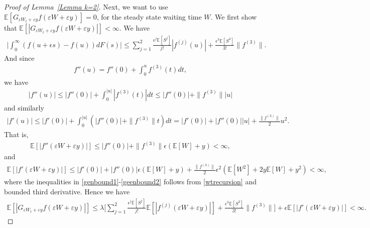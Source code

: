 \documentclass[10pt,a4paper]{amsart}
\begin{document}
\begin{proof}[Proof of Lemma~\ref{Lemma k=2}]
Next, we want to use $ \mathbb E[G_{\varepsilon W_t+\varepsilon y}f(\varepsilon W+\varepsilon y) ]=0$, for the steady state waiting time $W$. We first show that $ \mathbb E[|G_{\varepsilon W_t+\varepsilon y}f(\varepsilon W+\varepsilon y)| ] < \infty$. We have 
\begin{align*}
    \bigg|\int_0^\infty (f(u+\epsilon s)-f(u)) dF(s) \bigg| \leq \sum_{j=1}^2 \frac{\epsilon^j \mathbb E[S^j]}{j!}|f^{(j)}(u)|+\frac{\epsilon^3\mathbb E[S^3]}{3!}\|f^{(3)}\|.
\end{align*}
And since
\begin{align*}
    f''(u)=f''(0)+\int_{0}^{u}f^{(3)}(t)dt,
\end{align*}
we have 
\begin{align*}
    |f''(u)| \leq |f''(0)|+\int_{0}^{|u|}|f^{(3)}(t)|dt \leq |f''(0)| +\|f^{(3)}\||u| 
\end{align*}
and similarly
\begin{align}\label{genbound1}
    |f'(u)| \leq |f'(0)|+\int_0^{|u|} (|f''(0)| +\|f^{(3)}\|t)dt=|f'(0)|+|f''(0)||u|+\frac{\|f^{(3)}\|}{2}u^2.
\end{align}
That is,
\begin{align}\label{geenbound2}
    \mathbb E[|f''(\varepsilon W+\varepsilon y)|] \leq  |f''(0)| +\|f^{(3)}\| \epsilon (\mathbb E[W]+y)< \infty,
\end{align}
and 
\begin{align*}
    \mathbb E[|f'(\varepsilon W+\varepsilon y)|] \leq |f'(0)|+|f''(0)|\epsilon(\mathbb E[W]+y)+\frac{\|f^{(3)}\|}{2}\epsilon^2(\mathbb E[W^2]+2y \mathbb E[W]+y^2)< \infty,
\end{align*}
where the inequalities in \eqref{genbound1}-\eqref{geenbound2} follows from \eqref{wtrecursion} and bounded third derivative.
Hence we have 
\begin{align}\label{genbound3}
    \mathbb E[|G_{\varepsilon W_t+\varepsilon y}f(\varepsilon W+\varepsilon y)| ] \leq \lambda \bigg[ \sum_{j=1}^2 \frac{\epsilon^j \mathbb E[S^j]}{j!}\mathbb E[|f^{(j)}(\varepsilon W+\varepsilon y)|]+\frac{\epsilon^3\mathbb E[S^3]}{3!}\|f^{(3)}\|\bigg] +\epsilon \mathbb E[  |f'(\varepsilon W+\varepsilon y)|]< \infty.
\end{align}


\end{proof}
\end{document}
